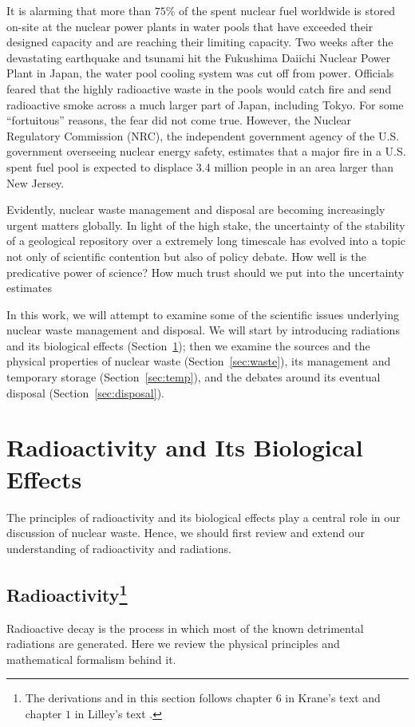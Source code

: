 \documentclass[nofootinbib,preprint,aps]{revtex4-1}
\begin{document}
It is alarming that more than $75\%$ of the spent nuclear fuel worldwide is stored on-site at the nuclear power plants
in water pools that have exceeded their designed capacity and are reaching their limiting capacity.\cite{aa12}
Two weeks after the devastating earthquake and tsunami hit the Fukushima Daiichi Nuclear Power Plant in Japan,
the water pool cooling system was cut off from power. Officials feared that
the highly radioactive waste in the pools would catch fire and send radioactive smoke
across a much larger part of Japan, including Tokyo.\cite{s16} For some ``fortuitous'' reasons, the fear did not come true.
However, the Nuclear Regulatory Commission (NRC), the independent government agency
of the U.S. government overseeing nuclear energy safety,
estimates that a major fire in a U.S. spent fuel pool is expected to
displace 3.4 million people in an area larger than New Jersey.\cite{s16}

Evidently, nuclear waste management and disposal are becoming increasingly urgent matters globally.
In light of the high stake,
the uncertainty of the stability of a geological repository over a extremely long timescale has evolved into 
a topic not only of scientific contention but also of policy debate.
How well is the predicative power of science? How much trust should we put into the uncertainty estimates

In this work, we will attempt to examine some of the scientific issues underlying nuclear waste management
and disposal. We will start by introducing radiations and its biological effects (Section~\ref{sec:phys}); then
we examine the sources and the physical properties of nuclear waste (Section~\ref{sec:waste}),
its management and temporary storage (Section~\ref{sec:temp}), and the debates around its eventual disposal (Section~\ref{sec:disposal}).

\section{Radioactivity and Its Biological Effects}
\label{sec:phys}
The principles of radioactivity and its biological effects play a central role in our
discussion of nuclear waste. Hence, we should first review and extend our understanding of 
radioactivity and radiations.
    \subsection{Radioactivity\footnote{
    The derivations and in this section follows chapter $6$ in
    Krane's text \cite{k88} and chapter $1$ in Lilley's text \cite{l01}.
    }}
    Radioactive decay is the process in which most of the known detrimental radiations are generated.
    Here we review the physical principles and mathematical formalism behind it.
\end{document}
